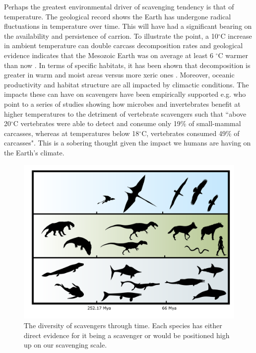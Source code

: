 \documentclass[a4paper,12pt]{article}
\begin{document}
Perhaps the greatest environmental driver of scavenging tendency is that of temperature. 
The geological record shows the Earth has undergone radical fluctuations in temperature over time.
This will have had a significant bearing on the availability and persistence of carrion.
To illustrate the point, a 10$^{\circ}$C increase in ambient temperature can double carcass decomposition rates \citep{parmenter2009carrion} and geological evidence indicates that the Mesozoic Earth was on average at least 6 $^{\circ}$C warmer than now \citep{sellwood2006mesozoic}.
In terms of specific habitats, it has been shown that decomposition is greater in warm and moist areas versus more xeric ones \citep{beasley2015vertebrates}.
Moreover, oceanic productivity and habitat structure are all impacted by climactic conditions.
The impacts these can have on scavengers have been empirically supported e.g. \cite{beasley2015vertebrates} who point to a series of studies showing how microbes and invertebrates benefit at higher temperatures to the detriment of vertebrate scavengers such that ``above 20$^{\circ}$C vertebrates were able to detect and consume only 19\% of small-mammal carcasses, whereas at temperatures below 18$^{\circ}$C, vertebrates consumed 49\% of carcasses".
This is a sobering thought given the impact we humans are having on the Earth's climate. 

\begin{figure}[!htbp]
\centering
   \includegraphics[width=1\textwidth]{timeline_figure/timeLine.pdf}
\caption{The diversity of scavengers through time. Each species has either direct evidence for it being a scavenger or would be positioned high up on our scavenging scale.}
\label{Timeline}
\end{figure}
\end{document}

